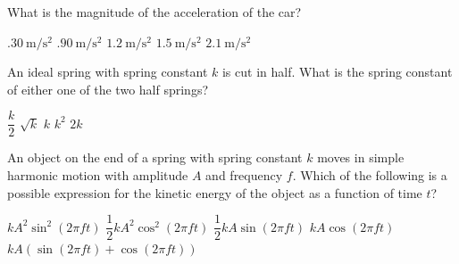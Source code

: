 \documentclass[12pt]{../../oss-apphys-exam}
\begin{document}
\begin{questions}
  \question What is the magnitude of the acceleration of the car?
  \label{car3}
  \begin{choices}
    \choice $\SI{.30}{\metre\per\second\squared}$
    \choice $\SI{.90}{\metre\per\second\squared}$
    \choice $\SI{1.2}{\metre\per\second\squared}$
    \choice $\SI{1.5}{\metre\per\second\squared}$
    \choice $\SI{2.1}{\metre\per\second\squared}$
  \end{choices}
  \newpage
  
  \question An ideal spring with spring constant $k$ is cut in half. What is the
  spring constant of either one of the two half springs?
  \begin{choices}
    \choice $\dfrac k2$
    \choice $\sqrt k$
    \choice $k$
    \choice $k^2$
    \choice $2k$
  \end{choices}
  \newpage
  
  \question An object on the end of a spring with spring constant $k$ moves in
  simple harmonic motion with amplitude $A$ and frequency $f$. Which of the
  following is a possible expression for the kinetic energy of the object as a
  function of time $t$?
  \begin{choices}
    \choice $kA^2 \sin^2(2\pi ft)$
    \choice $\dfrac12kA^2\cos^2(2\pi ft)$
    \choice $\dfrac12kA\sin(2\pi ft)$
    \choice $kA\cos(2\pi ft)$
    \choice $kA\left(\sin(2\pi ft)+\cos(2\pi ft)\right)$
  \end{choices}
  \newpage
  

\end{questions}
\end{document}
